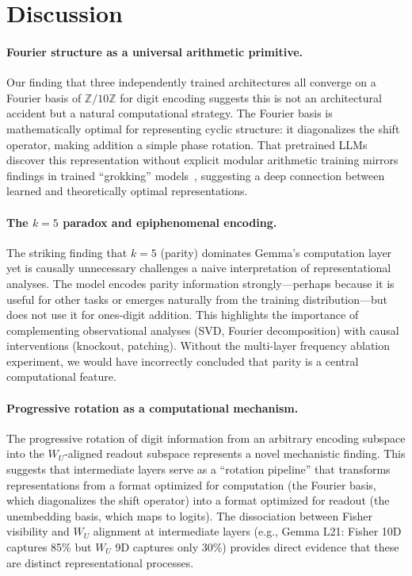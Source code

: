 \section{Discussion}
\label{sec:discussion}

\paragraph{Fourier structure as a universal arithmetic primitive.} Our finding that three independently trained architectures all converge on a Fourier basis of $\mathbb{Z}/10\mathbb{Z}$ for digit encoding suggests this is not an architectural accident but a natural computational strategy. The Fourier basis is mathematically optimal for representing cyclic structure: it diagonalizes the shift operator, making addition a simple phase rotation. That pretrained LLMs discover this representation without explicit modular arithmetic training mirrors findings in trained ``grokking'' models~\citep{nanda2023progress}, suggesting a deep connection between learned and theoretically optimal representations.

\paragraph{The $k{=}5$ paradox and epiphenomenal encoding.} The striking finding that $k{=}5$ (parity) dominates Gemma's computation layer yet is causally unnecessary challenges a naive interpretation of representational analyses. The model encodes parity information strongly---perhaps because it is useful for other tasks or emerges naturally from the training distribution---but does not use it for ones-digit addition. This highlights the importance of complementing observational analyses (SVD, Fourier decomposition) with causal interventions (knockout, patching). Without the multi-layer frequency ablation experiment, we would have incorrectly concluded that parity is a central computational feature.

\paragraph{Progressive rotation as a computational mechanism.} The progressive rotation of digit information from an arbitrary encoding subspace into the $W_U$-aligned readout subspace represents a novel mechanistic finding. This suggests that intermediate layers serve as a ``rotation pipeline'' that transforms representations from a format optimized for computation (the Fourier basis, which diagonalizes the shift operator) into a format optimized for readout (the unembedding basis, which maps to logits). The dissociation between Fisher visibility and $W_U$ alignment at intermediate layers (e.g., Gemma L21: Fisher 10D captures 85\% but $W_U$ 9D captures only 30\%) provides direct evidence that these are distinct representational processes.

